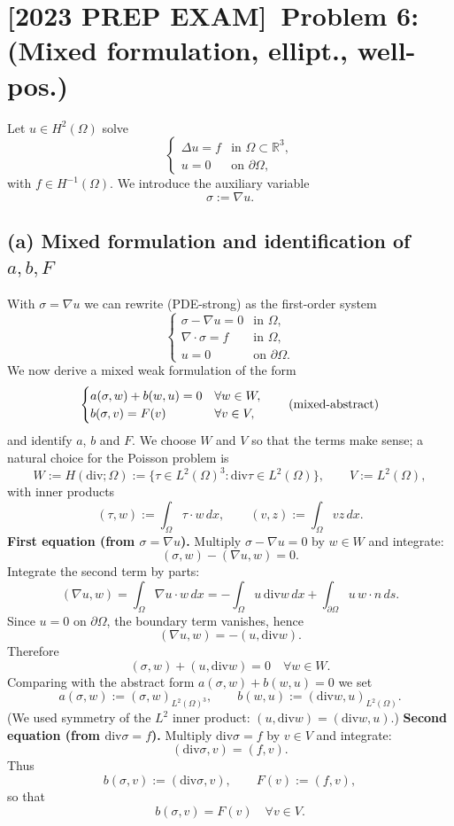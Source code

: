 \section*{[2023 PREP EXAM] Problem 6: (Mixed formulation, ellipt., well-pos.)}
Let $u \in H^2(\Omega)$ solve
\[
    \begin{cases}
        \Delta u = f & \text{in } \Omega \subset \mathbb{R}^3, \\
        u = 0        & \text{on } \partial\Omega,
    \end{cases} \tag{PDE-strong}
\]
with $f \in H^{-1}(\Omega)$.
We introduce the auxiliary variable
\[
    \sigma := \nabla u.
\]
\subsection*{(a) Mixed formulation and identification of $a,b,F$}
With $\sigma = \nabla u$ we can rewrite (PDE-strong) as the first-order system
\[
    \begin{cases}
        \sigma - \nabla u = 0   & \text{in } \Omega,         \\
        \nabla \cdot \sigma = f & \text{in } \Omega,         \\
        u = 0                   & \text{on } \partial\Omega.
    \end{cases}
\]
We now derive a mixed weak formulation of the form
\[
    \begin{cases}
        a(\sigma,w) + b(w,u) = 0 & \forall w \in W, \\
        b(\sigma,v) = F(v)       & \forall v \in V,
    \end{cases}
    \tag{\text{mixed-abstract}}
\]
and identify $a$, $b$ and $F$.
We choose $W$ and $V$ so that the terms make sense; a natural choice for the Poisson problem
is
\[
    W := H(\mathrm{div};\Omega)
    := \bigl\{ \tau \in L^2(\Omega)^3 : \mathrm{div} \tau \in L^2(\Omega) \bigr\},
    \qquad
    V := L^2(\Omega),
\]
with inner products
\[
    (\tau,w) := \int_\Omega \tau\cdot w \,dx,
    \qquad
    (v,z) := \int_\Omega v z \,dx.
\]
\textbf{First equation (from $\sigma = \nabla u$).}
Multiply $\sigma - \nabla u = 0$ by $w \in W$ and integrate:
\[
    (\sigma, w) - (\nabla u, w) = 0.
\]
Integrate the second term by parts:
\[
    (\nabla u, w)
    = \int_\Omega \nabla u \cdot w\,dx
    = -\int_\Omega u\,\mathrm{div} w\,dx + \int_{\partial\Omega} u\,w\cdot n \,ds.
\]
Since $u=0$ on $\partial\Omega$, the boundary term vanishes, hence
\[
    (\nabla u, w) = - (u, \mathrm{div} w).
\]
Therefore
\[
    (\sigma, w) + (u, \mathrm{div} w) = 0
    \quad \forall w\in W.
\]
Comparing with the abstract form $a(\sigma,w) + b(w,u) = 0$ we set
\[
    a(\sigma,w) := (\sigma,w)_{L^2(\Omega)^3},
    \qquad
    b(w,u) := (\mathrm{div} w, u)_{L^2(\Omega)}.
\]
(We used symmetry of the $L^2$ inner product: $(u,\mathrm{div} w) = (\mathrm{div} w,u)$.)
\textbf{Second equation (from $\mathrm{div}\sigma = f$).}
Multiply $\mathrm{div} \sigma = f$ by $v \in V$ and integrate:
\[
    (\mathrm{div}\sigma, v) = (f,v).
\]
Thus
\[
    b(\sigma,v) := (\mathrm{div} \sigma, v),
    \qquad
    F(v) := (f,v),
\]
so that
\[
    b(\sigma,v) = F(v) \quad \forall v\in V.
\]

